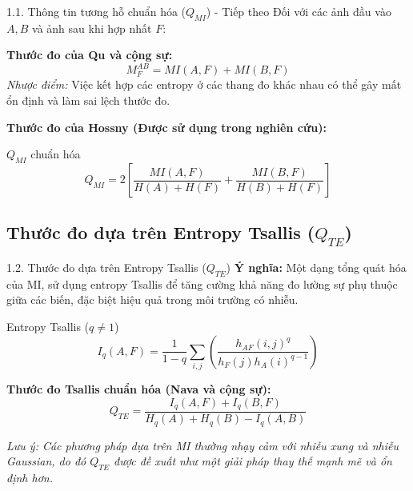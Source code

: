 \documentclass{beamer}
\begin{document}
\begin{frame}{1.1. Thông tin tương hỗ chuẩn hóa ($Q_{MI}$) - Tiếp theo}
    Đối với các ảnh đầu vào $A, B$ và ảnh sau khi hợp nhất $F$:

    \vspace{0.3cm}
    \textbf{Thước đo của Qu và cộng sự:}
    \begin{equation}
        M_{F}^{AB} = MI(A,F) + MI(B,F)
    \end{equation}
    \textit{Nhược điểm:} Việc kết hợp các entropy ở các thang đo khác nhau có thể gây mất ổn định và làm sai lệch thước đo.

    \vspace{0.3cm}
    \textbf{Thước đo của Hossny (Được sử dụng trong nghiên cứu):}
    \begin{block}{$Q_{MI}$ chuẩn hóa}
    \begin{equation}
        Q_{MI} = 2 \left[ \frac{MI(A,F)}{H(A)+H(F)} + \frac{MI(B,F)}{H(B)+H(F)} \right]
    \end{equation}
    \end{block}
\end{frame}

\subsection{Thước đo dựa trên Entropy Tsallis ($Q_{TE}$)}
\begin{frame}{1.2. Thước đo dựa trên Entropy Tsallis ($Q_{TE}$)}
    \textbf{Ý nghĩa:} Một dạng tổng quát hóa của MI, sử dụng entropy Tsallis để tăng cường khả năng đo lường sự phụ thuộc giữa các biến, đặc biệt hiệu quả trong môi trường có nhiễu.

    \begin{block}{Entropy Tsallis ($q \neq 1$)}
    \begin{equation}
        I_q(A,F) = \frac{1}{1-q} \sum_{i,j} \left( \frac{h_{AF}(i,j)^q}{h_F(j)h_A(i)^{q-1}} \right)
    \end{equation}
    \end{block}

    \textbf{Thước đo Tsallis chuẩn hóa (Nava và cộng sự):}
    \begin{equation}
        Q_{TE} = \frac{I_q(A,F) + I_q(B,F)}{H_q(A) + H_q(B) - I_q(A,B)}
    \end{equation}

    \vspace{0.2cm}
    \footnotesize{\textit{Lưu ý: Các phương pháp dựa trên MI thường nhạy cảm với nhiễu xung và nhiễu Gaussian, do đó $Q_{TE}$ được đề xuất như một giải pháp thay thế mạnh mẽ và ổn định hơn.}}
\end{frame}
\end{document}
